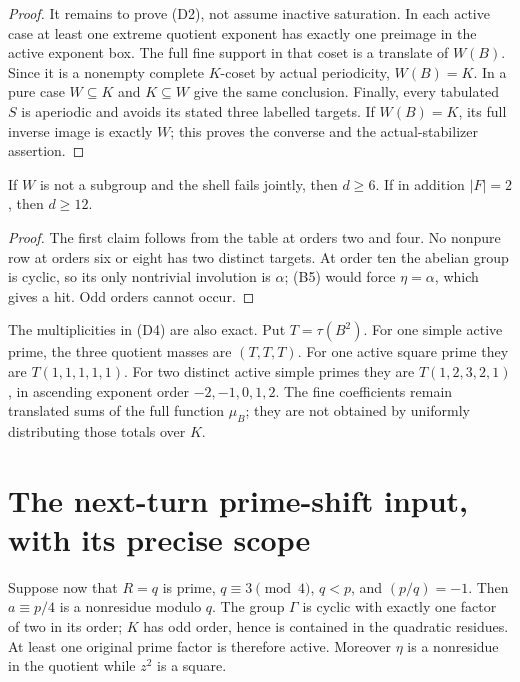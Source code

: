 \begin{proof}
It remains to prove (D2), not assume inactive saturation. In each active
case at least one extreme quotient exponent has exactly one preimage in the
active exponent box. The full fine support in that coset is a translate of
$W(B)$. Since it is a nonempty complete $K$-coset by actual periodicity,
$W(B)=K$. In a pure case $W\subseteq K$ and $K\subseteq W$ give the same
conclusion. Finally, every tabulated $S$ is aperiodic and avoids its stated
three labelled targets. If $W(B)=K$, its full inverse image is exactly $W$;
this proves the converse and the actual-stabilizer assertion.
\end{proof}

\begin{corollary}
If $W$ is not a subgroup and the shell fails jointly, then $d\ge6$.
If in addition $|F|=2$, then $d\ge12$.
\end{corollary}
\begin{proof}
The first claim follows from the table at orders two and four. No nonpure
row at orders six or eight has two distinct targets. At order ten the abelian
group is cyclic, so its only nontrivial involution is $\alpha$; (B5) would
force $\eta=\alpha$, which gives a hit. Odd orders cannot occur.
\end{proof}

The multiplicities in (D4) are also exact. Put $T=\tau(B^2)$.
For one simple active prime, the three quotient masses are $(T,T,T)$.
For one active square prime they are $T(1,1,1,1,1)$.
For two distinct active simple primes they are $T(1,2,3,2,1)$, in
ascending exponent order $-2,-1,0,1,2$. The fine coefficients remain
translated sums of the full function $\mu_B$; they are not obtained by
uniformly distributing those totals over $K$.

\section{The next-turn prime-shift input, with its precise scope}
Suppose now that $R=q$ is prime, $q\equiv3\pmod4$, $q<p$, and
$(p/q)=-1$. Then $a\equiv p/4$ is a nonresidue modulo $q$.
The group $\Gamma$ is cyclic with exactly one factor of two in its order;
$K$ has odd order, hence is contained in the quadratic residues. At least
one original prime factor is therefore active. Moreover $\eta$ is a
nonresidue in the quotient while $z^2$ is a square.

